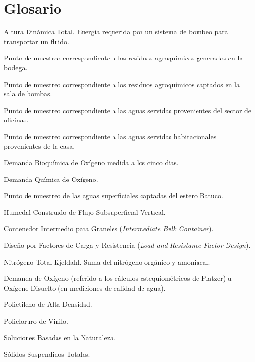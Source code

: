 \documentclass[12pt, letterpaper]{report}
\begin{document}
\newpage

\tableofcontents
\newpage
\listoffigures
{}
\newpage
\listoftables
{}
\newpage

\chapter*{Glosario}

\begin{description}[style=nextline, itemsep=0.5em]
    \item[ADT] Altura Dinámica Total. Energía requerida por un sistema de bombeo para transportar un fluido.
    \item[AGR1] Punto de muestreo correspondiente a los residuos agroquímicos generados en la bodega.
    \item[AGR2] Punto de muestreo correspondiente a los residuos agroquímicos captados en la sala de bombas.
    \item[AS1] Punto de muestreo correspondiente a las aguas servidas provenientes del sector de oficinas.
    \item[AS2] Punto de muestreo correspondiente a las aguas servidas habitacionales provenientes de la casa.
    \item[DBO$_5$] Demanda Bioquímica de Oxígeno medida a los cinco días.
    \item[DQO] Demanda Química de Oxígeno.
    \item[EST] Punto de muestreo de las aguas superficiales captadas del estero Batuco.
    \item[HCFV] Humedal Construido de Flujo Subsuperficial Vertical.
    \item[IBC] Contenedor Intermedio para Graneles (\textit{Intermediate Bulk Container}).
    \item[LRFD] Diseño por Factores de Carga y Resistencia (\textit{Load and Resistance Factor Design}).
    \item[NTK] Nitrógeno Total Kjeldahl. Suma del nitrógeno orgánico y amoniacal.
    \item[OD] Demanda de Oxígeno (referido a los cálculos estequiométricos de Platzer) u Oxígeno Disuelto (en mediciones de calidad de agua).
    \item[PEAD] Polietileno de Alta Densidad.
    \item[PVC] Policloruro de Vinilo.
    \item[SbN] Soluciones Basadas en la Naturaleza.
    \item[SST] Sólidos Suspendidos Totales.
\end{description}
\end{document}
